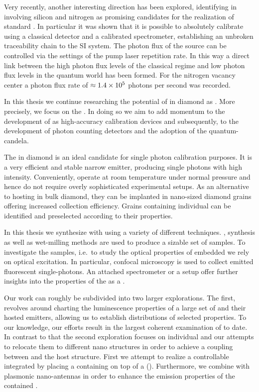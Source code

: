 	Very recently, another interesting direction has been explored, identifying \ccs in \nds involving silicon \cite{Rodiek2017::12, Rodiek2017::13} and nitrogen \cite{Rodiek2017::8} as promising candidates for the realization of standard \spss \cite{Rodiek2017,Vaigu2017}. In particular it was shown that it is possible to absolutely calibrate \spss using a classical detector and a calibrated spectrometer, establishing an unbroken traceability chain to the SI system. The photon flux of the source can be controlled via the settings of the pump laser repetition rate. In this way a direct link between the high photon flux levels of the classical regime and low photon flux levels in the quantum world has been formed. For the nitrogen vacancy center a photon flux rate of $\approx \num{1.4d5}$ photons per second was recorded.

	In this thesis we continue researching the potential of \ccs in diamond as \spss. More precisely, we focus on the \sivc. In doing so we aim to add momentum to the development of \sps as high-accuracy calibration devices and subsequently, to the development of photon counting detectors and the adoption of the quantum-candela.

	The \siv in diamond is an ideal candidate for single photon calibration purposes. It is a very efficient and stable narrow \lw emitter, producing single photons with high intensity. Conveniently, \sivs operate at room temperature under normal pressure and hence do not require overly sophisticated experimental setups. As an alternative to hosting \sivs in bulk diamond, they can be implanted in nano-sized diamond grains offering increased collection efficiency. Grains containing individual \sivs can be identified and preselected according to their properties.

	
	In this thesis we synthesize \nds with \sivs using a variety of different techniques. \Cvd, \hpht synthesis as well as wet-milling methods are used to produce a sizable set of samples. To investigate the samples, i.e.\ to study the optical properties of embedded \sivs we rely on optical excitation. In particular, confocal microscopy is used to collect emitted fluorescent single-photons. An attached spectrometer or a \HBT setup offer further insights into the properties of the \siv as a \sps. 


   	Our work can roughly be subdivided into two larger explorations. The first, revolves around charting the luminescence properties of a large set of \nds and their hosted emitters, allowing us to establish distributions of selected \siv properties. To our knowledge, our efforts result in the largest coherent examination of \sivs to date. In contrast to that the second exploration focuses on individual \nds and our attempts to relocate them to different nano structures in order to achieve a coupling between \sivs and the host structure. First we attempt to realize a controllable integrated \sps by placing a \nd containing \sivs on top of a \vcsel (\VCSEL). Furthermore, we combine \nds with plasmonic nano-antennas in order to enhance the emission properties of the contained \sivs. 


